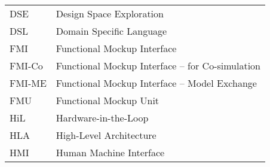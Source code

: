 \begin{longtable}{ll}
DSE	&Design Space Exploration\\
DSL & Domain Specific Language \\
FMI     &Functional Mockup Interface\\
FMI-Co  &Functional Mockup Interface -- for Co-simulation\\
FMI-ME  &Functional Mockup Interface -- Model Exchange\\
FMU     &Functional Mockup Unit\\
HiL	&Hardware-in-the-Loop\\
HLA & High-Level Architecture \\
HMI     &Human Machine Interface\\

\end{longtable}
